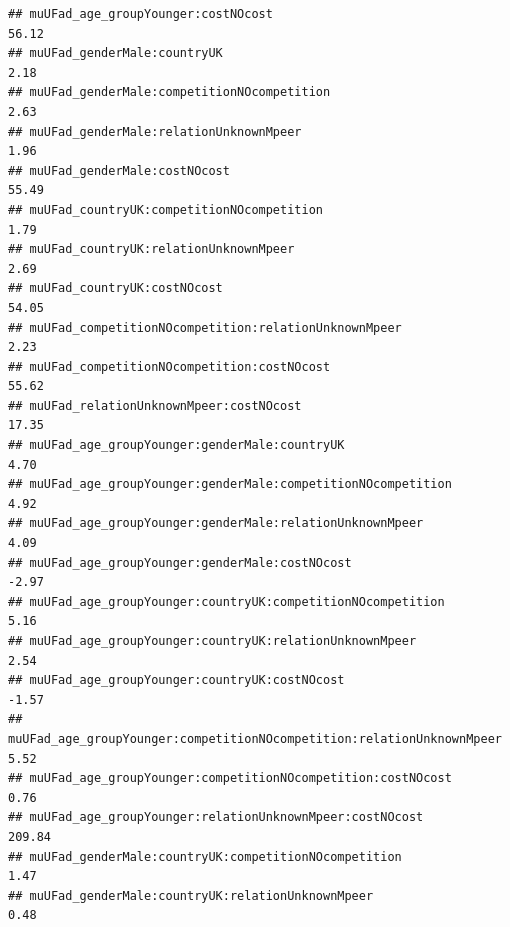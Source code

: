 \documentclass[
]{article}
\begin{document}
\begin{verbatim}
## muUFad_age_groupYounger:costNOcost                                                                        56.12
## muUFad_genderMale:countryUK                                                                                2.18
## muUFad_genderMale:competitionNOcompetition                                                                 2.63
## muUFad_genderMale:relationUnknownMpeer                                                                     1.96
## muUFad_genderMale:costNOcost                                                                              55.49
## muUFad_countryUK:competitionNOcompetition                                                                  1.79
## muUFad_countryUK:relationUnknownMpeer                                                                      2.69
## muUFad_countryUK:costNOcost                                                                               54.05
## muUFad_competitionNOcompetition:relationUnknownMpeer                                                       2.23
## muUFad_competitionNOcompetition:costNOcost                                                                55.62
## muUFad_relationUnknownMpeer:costNOcost                                                                    17.35
## muUFad_age_groupYounger:genderMale:countryUK                                                               4.70
## muUFad_age_groupYounger:genderMale:competitionNOcompetition                                                4.92
## muUFad_age_groupYounger:genderMale:relationUnknownMpeer                                                    4.09
## muUFad_age_groupYounger:genderMale:costNOcost                                                             -2.97
## muUFad_age_groupYounger:countryUK:competitionNOcompetition                                                 5.16
## muUFad_age_groupYounger:countryUK:relationUnknownMpeer                                                     2.54
## muUFad_age_groupYounger:countryUK:costNOcost                                                              -1.57
## muUFad_age_groupYounger:competitionNOcompetition:relationUnknownMpeer                                      5.52
## muUFad_age_groupYounger:competitionNOcompetition:costNOcost                                                0.76
## muUFad_age_groupYounger:relationUnknownMpeer:costNOcost                                                  209.84
## muUFad_genderMale:countryUK:competitionNOcompetition                                                       1.47
## muUFad_genderMale:countryUK:relationUnknownMpeer                                                           0.48

\end{verbatim}
\end{document}
